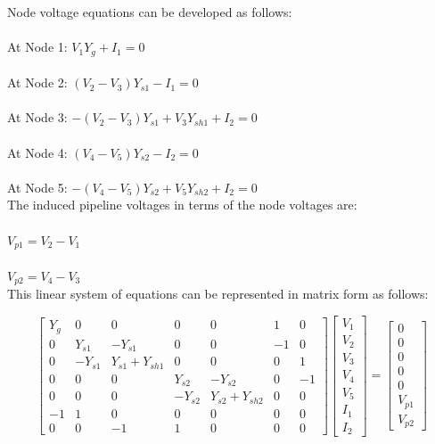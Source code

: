 \documentclass{article}
\begin{document}
Node voltage equations can be developed as follows:
\\ \\
\hphantom{whe}At Node 1: $V_1 Y_g + I_1 = 0$ \\ \\
\hphantom{whe}At Node 2: $(V_2 - V_3)Y_{s1} - I_1 = 0$ \\ \\
\hphantom{whe}At Node 3: $-(V_2 - V_3)Y_{s1} + V_3 Y_{sh1} + I_2 = 0$ \\ \\
\hphantom{whe}At Node 4: $(V_4 - V_5)Y_{s2} - I_2 = 0$ \\ \\
\hphantom{whe}At Node 5: $-(V_4 - V_5)Y_{s2} + V_5 Y_{sh2} + I_2 = 0$ \\

The induced pipeline voltages in terms of the node voltages are:
\\ \\
\hphantom{whe}$V_{p1} = V_2 - V_1 $ \\ \\
\hphantom{whe}$V_{p2} = V_4 - V_3 $ \\

This linear system of equations can be represented in matrix form as follows:

\begin{equation}
\begin{bmatrix}
Y_g & 0 & 0 & 0 & 0 & 1 & 0 \\
0 & Y_{s1} & -Y_{s1} & 0 & 0 & -1 & 0 \\
0 & -Y_{s1} & Y_{s1} + Y_{sh1} & 0 & 0 & 0 & 1 \\
0 & 0 & 0 & Y_{s2} & -Y_{s2} & 0 & -1 \\
0 & 0 & 0 & -Y_{s2} & Y_{s2} + Y_{sh2} & 0 & 0 \\
-1 & 1 & 0 & 0 & 0 & 0 & 0 \\
0 & 0 & -1 & 1 & 0 & 0 & 0
\end{bmatrix}
\begin{bmatrix}
V_{1} \\ V_{2} \\ V_{3} \\ V_{4} \\ V_{5} \\ I_{1} \\ I_{2}
\end{bmatrix}
=
\begin{bmatrix}
0 \\ 0 \\ 0 \\ 0 \\ 0 \\ V_{p1} \\ V_{p2}
\end{bmatrix}
\end{equation}
\end{document}
